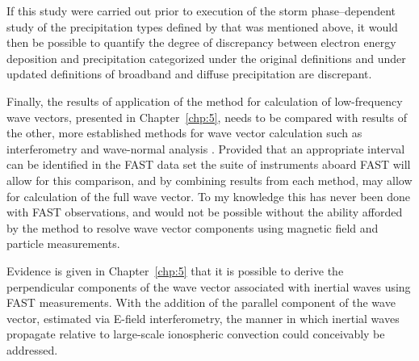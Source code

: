   If this study were carried out prior to execution of the storm
  phase--dependent study of the precipitation types defined by
  \citet{Newell2009}that was mentioned above, it would then be possible to
  quantify the degree of discrepancy between electron energy deposition and
  precipitation categorized under the original \citet{Newell2009} definitions
  and under updated definitions of broadband and diffuse precipitation are
  discrepant.

  Finally, the results of application of the \citet{Bellan2016} method for
  calculation of low-frequency wave vectors, presented in Chapter~\ref{chp:5},
  needs to be compared with results of the other, more established methods for
  wave vector calculation such as interferometry \citep{LaBelle1989,Pfaffa} and
  wave-normal analysis \citep{Santolik2003}. Provided that an appropriate
  interval can be identified in the FAST data set the suite of instruments
  aboard FAST will allow for this comparison, and by combining results from each
  method, may allow for calculation of the full wave vector. To my knowledge
  this has never been done with FAST observations, and would not be possible
  without the ability afforded by the \citet{Bellan2016} method to resolve wave
  vector components using magnetic field and particle measurements.
  
  Evidence is given in Chapter~\ref{chp:5} that it is possible to derive the
  perpendicular components of the wave vector associated with inertial \Alf
  waves using FAST measurements. With the addition of the parallel component of
  the wave vector, estimated via E-field interferometry, the manner in which
  inertial \Alf waves propagate relative to large-scale ionospheric convection
  could conceivably be addressed.

  
  
